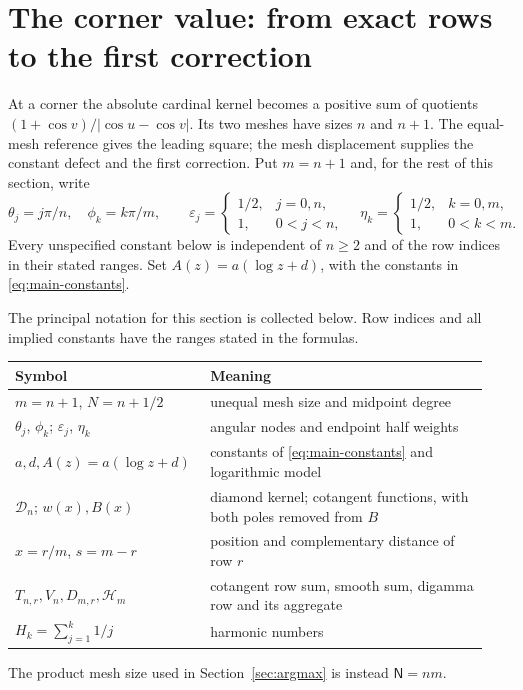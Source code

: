 \section{The corner value: from exact rows to the first correction}
\label{sec:corner}

At a corner the absolute cardinal kernel becomes a positive sum of quotients $(1+\cos v)/|\cos u-\cos v|$.
Its two meshes have sizes $n$ and $n+1$. The equal-mesh reference gives
the leading square; the mesh displacement supplies the constant defect
and the first correction.
Put $m=n+1$ and, for the rest of this section, write
\[
 \theta_j=j\pi/n,\quad \phi_k=k\pi/m,\qquad
 \varepsilon_j=\begin{cases}1/2,&j=0,n,\\1,&0<j<n,\end{cases}
 \quad \eta_k=\begin{cases}1/2,&k=0,m,\\1,&0<k<m.\end{cases}
\]
Every unspecified constant below is independent of $n\geq2$ and of the
row indices in their stated ranges. Set $A(z)=a(\log z+d)$, with the
constants in \eqref{eq:main-constants}.


The principal notation for this section is collected below. Row indices
and all implied constants have the ranges stated in the formulas.
\begin{center}
\begin{tabular}{@{}p{0.36\linewidth}p{0.58\linewidth}@{}}
\toprule
Symbol & Meaning\\
\midrule
$m=n+1$, $N=n+1/2$ & unequal mesh size and midpoint degree\\
$\theta_j$, $\phi_k$; $\varepsilon_j$, $\eta_k$ & angular nodes and endpoint half weights\\
$a,d,A(z)=a(\log z+d)$ & constants of \eqref{eq:main-constants} and logarithmic model\\
$\mathcal D_n$; $w(x),B(x)$ & diamond kernel; cotangent functions, with both poles removed from $B$\\
$x=r/m$, $s=m-r$ & position and complementary distance of row $r$\\
$T_{n,r},V_n,D_{m,r},\mathcal H_m$ & cotangent row sum, smooth sum, digamma row and its aggregate\\
$H_k=\sum_{j=1}^k1/j$ & harmonic numbers\\
\bottomrule
\end{tabular}
\end{center}
The product mesh size used in Section~\ref{sec:argmax} is instead
$\mathsf N=nm$.

